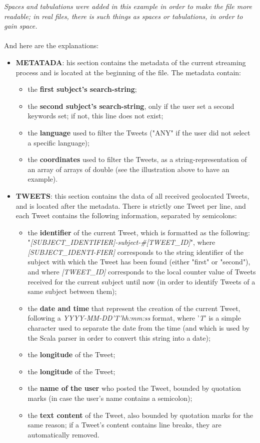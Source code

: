 \documentclass[a4paper,11pt]{report}
\begin{document}
\textit{Spaces and tabulations were added in this example in order to make the file more readable; in real files, there is such things as spaces or tabulations, in order to gain space.}\\\\
And here are the explanations:
\begin{itemize}
	\item \textbf{METATADA}: his section contains the metadata of the current streaming process and is located at the beginning of the file. The metadata contain: 
	\begin{itemize}
		\item the \textbf{first subject's search-string};
		\item the \textbf{second subject's search-string}, only if the user set a second keywords set; if not, this line does not exist;
		\item the \textbf{language} used to filter the Tweets ("ANY" if the user did not select a specific language);
		\item the \textbf{coordinates} used to filter the Tweets, as a string-representation of an array of arrays of double (see the illustration above to have an example).
	\end{itemize}
	
	\item \textbf{TWEETS}: this section contains the data of all received geolocated Tweets, and is located after the metadata. There is strictly one Tweet per line, and each Tweet contains the following information, separated by semicolons:
	\begin{itemize}
		\item the \textbf{identifier} of the current Tweet, which is formatted  as the following: \\"\emph{[SUBJECT\_IDENTIFIER]-subject-\#[TWEET\_ID]}", where \emph{[SUBJECT\_IDENTI-FIER]} corresponds to the string identifier of the subject with which the Tweet has been found (either "first" or "second"), and where \emph{[TWEET\_ID]} corresponds to the local counter value of Tweets received for the current subject until now (in order to identify Tweets of a same subject between them);
		\item the \textbf{date and time} that represent the creation of the current Tweet, following a \emph{YYYY-MM-DD'T'hh:mm:ss} format, where '\emph{T}' is a simple character used to separate the date from the time (and which is used by the Scala parser in order to convert this string into a date);
		\item the \textbf{longitude} of the Tweet;
		\item the \textbf{longitude} of the Tweet;
		\item the \textbf{name of the user} who posted the Tweet, bounded by quotation marks (in case the user's name contains a semicolon);
		\item the \textbf{text content} of the Tweet, also bounded by quotation marks for the same reason; if a Tweet's content contains line breaks, they are automatically removed.
	\end{itemize}
	

\end{itemize}
\end{document}
